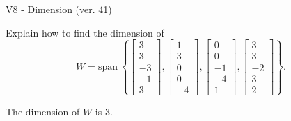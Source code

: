 \begin{exercise}
  \begin{exerciseTitle}V8 - Dimension (ver. 41)\end{exerciseTitle}
  \begin{exerciseStatement}
    Explain how to find the dimension of 
\[W=\mathrm{span}\ \left\{\left[\begin{array}{r}
3 \\
3 \\
-3 \\
-1 \\
3
\end{array}\right] , \left[\begin{array}{r}
1 \\
3 \\
0 \\
0 \\
-4
\end{array}\right] , \left[\begin{array}{r}
0 \\
0 \\
-1 \\
-4 \\
1
\end{array}\right] , \left[\begin{array}{r}
3 \\
3 \\
-2 \\
3 \\
2
\end{array}\right]\right\}.\]



  \end{exerciseStatement}
  \begin{exerciseAnswer}
   The dimension of \(W\) is  \(3\).
  


  \end{exerciseAnswer}
\end{exercise}